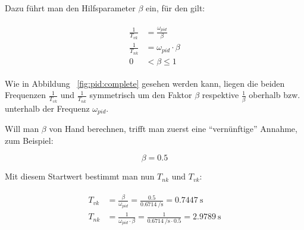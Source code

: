 Dazu f\"uhrt man den Hilfsparameter $\beta$ ein, f\"ur den gilt:

\begin{gather} \label{eq:pid:beta:start}
    \begin{split}
        \frac{1}{T_{vk}} & = \frac{\omega_{pid}}{\beta} \\
        \frac{1}{T_{nk}} & = \omega_{pid} \cdot \beta  \\
                       0 & <  \beta \leq 1
    \end{split}
\end{gather}

Wie in Abbildung  ~\ref{fig:pid:complete} gesehen werden kann\footnotemark[8],
liegen  die   beiden  Frequenzen  $\frac{1}{T_{vk}}$   und  $\frac{1}{T_{nk}}$
symmetrisch um  den Faktor $\beta$ respektive  $\frac{1}{\beta}$ oberhalb bzw.
unterhalb der Frequenz $\omega_{pid}$.



Will man $\beta$ von Hand  berechnen, trifft man zuerst eine ``vern\"unftige''
Annahme, zum Beispiel:

\begin{equation} \label{eq:pid:beta:initial_value}
    \beta = 0.5
\end{equation}

Mit  diesem Startwert  bestimmt  man nun  $T_{nk}$  und ${T_{vk}}$:

\begin{gather} \label{eq:pid:t_nk_t_vk_initial_results}
    \begin{split}
        {T_{vk}} & = \frac{\beta}{\omega_{pid}}  = \frac{0.5}{\SI{0.6714}{\per\second}}                   = \SI{0.7447}{\second} \\
        {T_{nk}} & = \frac{1}{\omega_{pid} \cdot \beta} = \frac{1}{\SI{0.6714}{\per\second} \cdot 0.5 }  = \SI{2.9789}{\second} \\
    \end{split}
\end{gather}

